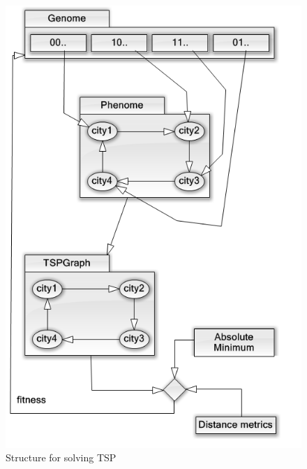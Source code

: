 \documentclass[10pt]{article}
\begin{document}
	\begin{figure}[H]
		\centering
			\includegraphics[width=.5\linewidth]{./../images/TSPStruct.png}
			\caption{Structure for solving TSP}
			\label{fig:sketch}
	\end{figure}
\end{document}
